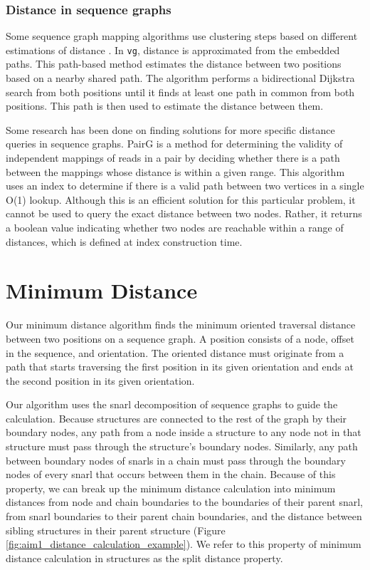 \documentclass[11pt]{ucscthesis}
\begin{document}
\subsubsection{Distance in sequence graphs}

Some sequence graph mapping algorithms use clustering steps based on different estimations of distance \cite{vaddadi_read_2019,garrison_variation_2018}. 
In \texttt{vg}, distance is approximated from the embedded paths.
This path-based method estimates the distance between two positions based on a nearby shared path.
The algorithm performs a bidirectional Dijkstra search from both positions until it finds at least one path in common from both positions.
This path is then used to estimate the distance between them. 


Some research has been done on finding solutions for more specific distance queries in sequence graphs.
PairG \cite{jain_validating_2019} is a method for determining the validity of independent mappings of reads in a pair by deciding whether there is a path between the mappings whose distance is within a given range.
This algorithm uses an index to determine if there is a valid path between two vertices in a single O(1) lookup.
Although this is an efficient solution for this particular problem, it cannot be used to query the exact distance between two nodes.
Rather, it returns a boolean value indicating whether two nodes are reachable within a range of distances, which is defined at index construction time.

\section {Minimum Distance}

Our minimum distance algorithm finds the minimum oriented traversal distance between two positions on a sequence graph. 
A position consists of a node, offset in the sequence, and orientation.
The oriented distance must originate from a path that starts traversing the first position in its given orientation and ends at the second position in its given orientation.


Our algorithm uses the snarl decomposition of sequence graphs to guide the calculation.
Because structures are connected to the rest of the graph by their boundary nodes, any path from a node inside a structure to any node not in that structure must pass through the structure's boundary nodes.
Similarly, any path between boundary nodes of snarls in a chain must pass through the boundary nodes of every snarl that occurs between them in the chain.
Because of this property, we can break up the minimum distance calculation into minimum distances from node and chain boundaries to the boundaries of their parent snarl, from snarl boundaries to their parent chain boundaries, and the distance between sibling structures in their parent structure (Figure \ref{fig:aim1_distance_calculation_example}).
We refer to this property of minimum distance calculation in structures as the split distance property.
\end{document}
